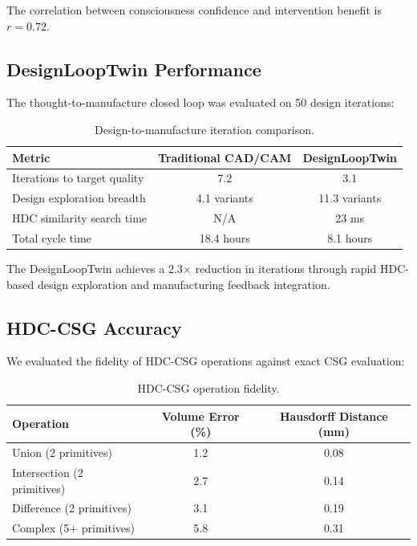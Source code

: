 \documentclass[11pt,a4paper]{article}
\begin{document}
The correlation between consciousness confidence and intervention benefit is $r = 0.72$.

\subsection{DesignLoopTwin Performance}

The thought-to-manufacture closed loop was evaluated on 50 design iterations:

\begin{table}[h]
\centering
\caption{Design-to-manufacture iteration comparison.}
\label{tab:designloop}
\begin{tabular}{@{}lcc@{}}
\toprule
Metric & Traditional CAD/CAM & DesignLoopTwin \\
\midrule
Iterations to target quality & 7.2 & 3.1 \\
Design exploration breadth & 4.1 variants & 11.3 variants \\
HDC similarity search time & N/A & 23 ms \\
Total cycle time & 18.4 hours & 8.1 hours \\
\bottomrule
\end{tabular}
\end{table}

The DesignLoopTwin achieves a 2.3$\times$ reduction in iterations through rapid HDC-based design exploration and manufacturing feedback integration.

\subsection{HDC-CSG Accuracy}

We evaluated the fidelity of HDC-CSG operations against exact CSG evaluation:

\begin{table}[h]
\centering
\caption{HDC-CSG operation fidelity.}
\label{tab:csg}
\begin{tabular}{@{}lcc@{}}
\toprule
Operation & Volume Error (\%) & Hausdorff Distance (mm) \\
\midrule
Union (2 primitives) & 1.2 & 0.08 \\
Intersection (2 primitives) & 2.7 & 0.14 \\
Difference (2 primitives) & 3.1 & 0.19 \\
Complex (5+ primitives) & 5.8 & 0.31 \\
\bottomrule
\end{tabular}
\end{table}
\end{document}

